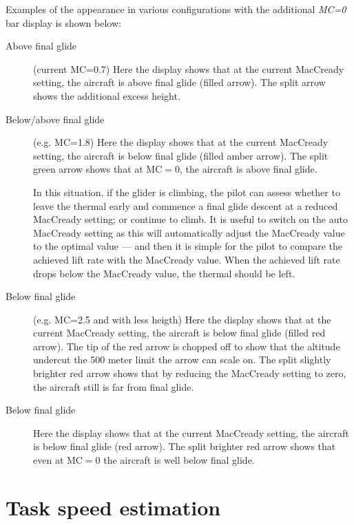 Examples of the appearance in various configurations with the additional {\em MC=0} 
bar display is shown below:

\begin{description}
\item[Above final glide] (current MC=0.7)
  Here the display shows that at the current MacCready setting, the aircraft
  is above final glide (filled arrow).  The split arrow shows the additional
  excess height.

\item[Below/above final glide] (e.g. MC=1.8)
  Here the display shows that at the current MacCready setting, the aircraft
  is below final glide (filled amber arrow).  The split green arrow
  shows that at MC$=0$, the aircraft is above final glide.

  In this situation, if the glider is climbing, the pilot can assess
  whether to leave the thermal early and commence a final glide
  descent at a reduced MacCready setting; or continue to climb.  It is
  useful to switch on the auto MacCready setting as this will
  automatically adjust the MacCready value to the optimal value ---
  and then it is simple for the pilot to compare the achieved lift
  rate with the MacCready value.  When the achieved lift rate drops
  below the MacCready value, the thermal should be left.

\item[Below final glide] (e.g. MC=2.5 and with less heigth)
  Here the display shows that at the current MacCready setting, the aircraft
  is below final glide (filled red arrow).  The tip of the red arrow is chopped off
  to show that the altitude undercut the 500 meter limit the arrow can scale on.
  The split slightly brighter red arrow shows that by reducing the MacCready 
  setting to zero, the aircraft still is far from final glide.

\item[Below final glide] 
  Here the display shows that at the current MacCready setting, the aircraft
  is below final glide (red arrow).  The split brighter red arrow
  shows that even at MC$=0$ the aircraft is well below final glide.
\end{description}


\section{Task speed estimation}\label{sec:task-speed-estim}

